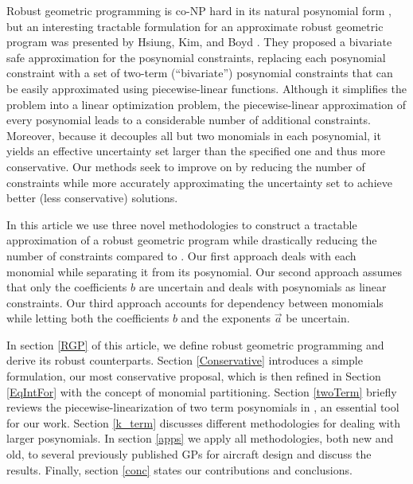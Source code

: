Robust geometric programming is co-NP hard in its natural posynomial form \cite{RGPcoNP}, but an interesting tractable formulation for an approximate robust geometric program was presented by Hsiung, Kim, and Boyd \cite{hsiung_kim_boyd_2007}. They proposed a bivariate safe approximation for the posynomial constraints, replacing each posynomial constraint with a set of two-term (``bivariate'') posynomial constraints that can be easily approximated using piecewise-linear functions. Although it simplifies the problem into a linear optimization problem, the piecewise-linear approximation of every posynomial leads to a considerable number of additional constraints. Moreover, because it decouples all but two monomials in each posynomial, it yields an effective uncertainty set larger than the specified one and thus more conservative. Our methods seek to improve on \cite{hsiung_kim_boyd_2007} by reducing the number of constraints while more accurately approximating the uncertainty set to achieve better (less conservative) solutions.

In this article we use three novel methodologies to construct a tractable approximation of a robust geometric program while drastically reducing the number of constraints compared to \cite{hsiung_kim_boyd_2007}. Our first approach deals with each monomial while separating it from its posynomial. Our second approach assumes that only the coefficients $b$ are uncertain and deals with posynomials as linear constraints. Our third approach accounts for dependency between monomials while letting both the coefficients $b$ and the exponents $\vec{a}$ be uncertain.

In section \ref{RGP} of this article, we define robust geometric programming and derive its robust counterparts. Section \ref{Conservative} introduces a simple formulation, our most conservative proposal, which is then refined in Section \ref{EqIntFor} with the concept of monomial partitioning. Section \ref{twoTerm} briefly reviews the piecewise-linearization of two term posynomials in \cite{hsiung_kim_boyd_2007}, an essential tool for our work. Section \ref{k_term} discusses different methodologies for dealing with larger posynomials. In section \ref{apps} we apply all methodologies, both new and old, to several previously published GPs for aircraft design and discuss the results. Finally, section \ref{conc} states our contributions and conclusions.